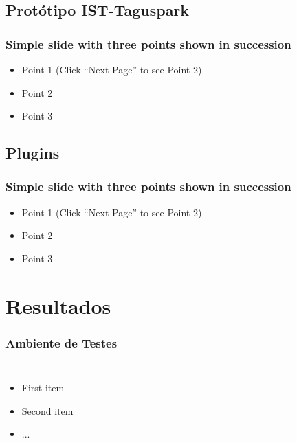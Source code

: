 \documentclass[]{beamer}
\begin{document}
\subsection{Protótipo IST-Taguspark}

\begin{frame}
  \frametitle{Simple slide with three points shown in succession}   %

  \begin{itemize}
  \item<1-> Point 1 (Click ``Next Page'' to see Point 2) %
  \item<2-> Point 2  %
  \item<3-> Point 3
  \end{itemize}
\end{frame}

\subsection{Plugins}

\begin{frame}
  \frametitle{Simple slide with three points shown in succession}   %

  \begin{itemize}
  \item<1-> Point 1 (Click ``Next Page'' to see Point 2) %
  \item<2-> Point 2  %
  \item<3-> Point 3
  \end{itemize}
\end{frame}

\section{Resultados}

\begin{frame}
  \frametitle{Ambiente de Testes}   %
  \begin{columns}[c]
  \column{2in}  %
  \begin{itemize}
  \item<1-> First item
  \item<2-> Second item
  \item<3-> ...
  \end{itemize}
  \column{2in}
  \end{columns}
\end{frame}
\end{document}
